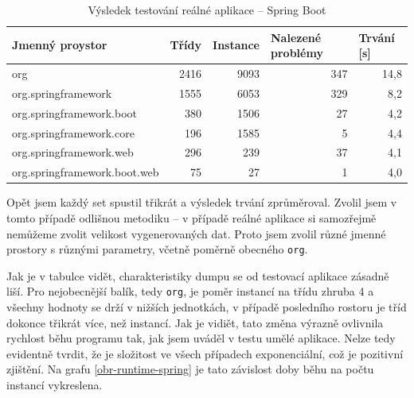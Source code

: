 \begin{table}[ht!]
    \begin{tabular}{|l|r|r|r|r|}
    \hline
    \textbf{Jmenný proystor}           & \multicolumn{1}{|l|}{\textbf{Třídy}} & \multicolumn{1}{l|}{\textbf{Instance}} & \multicolumn{1}{l|}{\textbf{Nalezené problémy}} & \multicolumn{1}{l|}{\textbf{Trvání {[}s{]}}} \\ \hline \hline
    org                          & 2416 & 9093     & 347         & 14,8     \\ \hline
    org.springframework          & 1555 & 6053     & 329         & 8,2      \\ \hline
    org.springframework.boot     & 380  & 1506     & 27          & 4,2      \\ \hline
    org.springframework.core     & 196  & 1585     & 5           & 4,4      \\ \hline
    org.springframework.web      & 296  & 239      & 37          & 4,1      \\ \hline
    org.springframework.boot.web & 75   & 27       & 1           & 4,0     \\ \hline
    \end{tabular}
    \caption{Výsledek testování reálné aplikace -- Spring Boot}
    \label{table-spring-boot-test}
\end{table}

Opět jsem každý set spustil třikrát a výsledek trvání zprůměroval. Zvolil jsem v tomto případě odlišnou metodiku -- v případě reálné aplikace si samozřejmě nemůžeme zvolit velikost vygenerovaných dat. Proto jsem zvolil různé jmenné prostory s různými parametry, včetně poměrně obecného \texttt{org}.

Jak je v tabulce vidět, charakteristiky dumpu se od testovací aplikace zásadně liší. Pro nejobecnější balík, tedy \texttt{org}, je poměr instancí na třídu zhruba 4 a všechny hodnoty se drží v nižších jednotkách, v případě posledního rostoru je tříd dokonce třikrát více, než instancí. Jak je vidiět, tato změna výrazně ovlivnila rychlost běhu programu tak, jak jsem uváděl v testu umělé aplikace. Nelze tedy evidentně tvrdit, že je složitost ve všech případech exponenciální, což je pozitivní zjištění. Na grafu \ref{obr-runtime-spring} je tato závislost doby běhu na počtu instancí vykreslena.


